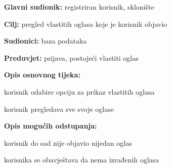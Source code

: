 					\noindent {}
					\begin{packed_item}
						
						\item \textbf{Glavni sudionik: } registriran korisnik, sklonište
						\item  \textbf{Cilj:} pregled vlastitih oglasa koje je korisnik objavio
						\item  \textbf{Sudionici:} baza podataka
						\item  \textbf{Preduvjet:} prijava, postojeći vlastiti oglas
						\item  \textbf{Opis osnovnog tijeka:}
						
						\item[] \begin{packed_enum}
							
							\item korisnik odabire opciju za prikaz vlastitih oglasa
							\item korisnik pregledava sve svoje oglase
						\end{packed_enum}
						
						\item  \textbf{Opis mogućih odstupanja:}
						
						\item[] \begin{packed_item}
							
							\item[1.a] korisnik do sad nije objavio nijedan oglas
							\item[] \begin{packed_enum}
								\item  korisnika se obavještava da nema izrađenih oglasa
							\end{packed_enum}
							
						\end{packed_item}
						
					\end{packed_item}
					
